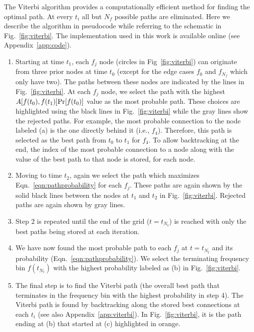 \documentclass[paper-main.tex]{subfiles}
\begin{document}
The Viterbi algorithm provides a computationally efficient method for finding the optimal path. 
At every $t_i$ all but $N_f$ possible paths are eliminated. 
Here we describe the algorithm in pseudocode while referring to the schematic in Fig.~\ref{fig:viterbi}.  
The implementation used in this work is available online (see Appendix~\ref{app:code}).
\begin{enumerate}
\item Starting at time $t_1$, each $f_j$ node (circles in Fig~\ref{fig:viterbi}) can originate from three prior nodes at time $t_0$ (except for the edge cases $f_0$ and $f_{N_f}$ which only have two). 
The paths between these nodes are indicated by the lines in Fig.~\ref{fig:viterbi}. 
At each $f_j$ node, we select the path with the highest $A[f(t_0),f(t_1)] {\rm Pr}[f(t_0)]$ value as the most probable path. 
These choices are highlighted using the black lines in Fig.~\ref{fig:viterbi} while the gray lines show the rejected paths. 
For example, the most probable connection to the node labeled (a) is the one directly behind it (i.e., $f_4$). 
Therefore, this path is selected as the best path from $t_0$ to $t_1$ for $f_4$.
To allow backtracking at the end, the index of the most probable connection to a node along with the value of the best path to that node is stored, for each node.

\item Moving to time $t_2$, again we select the path which maximizes Eqn.~\ref{eqn:pathprobability} for each $f_j$. 
These paths are again shown by the solid black lines between the nodes at $t_1$ and $t_2$ in Fig.~\ref{fig:viterbi}.
Rejected paths are again shown by gray lines. 

\item Step 2 is repeated until the end of the grid ($t=t_{N_t}$) is reached with only the best paths being stored at each iteration. 

\item We have now found the most probable path to each $f_j$ at $t=t_{N_t}$ and its probability (Eqn.~\ref{eqn:pathprobability}). 
We select the terminating frequency bin $f(t_{N_t})$ with the highest probability labeled as (b) in Fig.~\ref{fig:viterbi}.

\item The final step is to find the Viterbi path (the overall best path that terminates in the frequency bin with the highest probability in step 4). 
The Viterbi path is found by backtracking along the stored best connections at each $t_i$ (see also Appendix~\ref{app:viterbi}). 
In Fig.~\ref{fig:viterbi}, it is the path ending at (b) that started at (c) highlighted in orange.
\end{enumerate}
\end{document}
